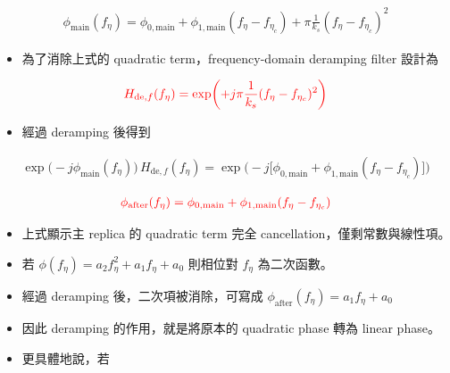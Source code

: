 \documentclass[11pt]{article}
\providecommand{\tightlist}{%
  \setlength{\itemsep}{0pt}\setlength{\parskip}{0pt}}
\begin{document}
\begin{equation}
\begin{aligned}
\phi_{\mathrm{main}}(f_\eta)=\phi_{0,\mathrm{main}}+\phi_{1,\mathrm{main}}(f_\eta-f_{\eta_c})+\pi\frac{1}{k_s}(f_\eta-f_{\eta_c})^2
\end{aligned}
\end{equation}

\begin{itemize}
\tightlist
\item
  為了消除上式的 quadratic term，frequency-domain deramping filter
  設計為
\end{itemize}

\begin{equation}
\begin{aligned}
{\color{red}{H_{\mathrm{de},f}(f_\eta)=\exp\biggl(+j\pi\frac{1}{k_s}(f_\eta-f_{\eta_c})^2\biggr)}}
\end{aligned}
\end{equation}

\begin{itemize}
\tightlist
\item
  經過 deramping 後得到
\end{itemize}

\begin{equation}
\begin{aligned}
\exp\biggl(-j\phi_{\mathrm{main}}(f_\eta)\biggr)\,H_{\mathrm{de},f}(f_\eta) =
\exp\biggl(-j\biggl[\phi_{0,\mathrm{main}}+\phi_{1,\mathrm{main}}(f_\eta-f_{\eta_c})\biggr]\biggr)
\end{aligned}
\end{equation}

\begin{equation}
\begin{aligned}
{\color{red}{\phi_{\mathrm{after}}(f_\eta)=\phi_{0,\mathrm{main}}+\phi_{1,\mathrm{main}}(f_\eta-f_{\eta_c})}}
\end{aligned}
\end{equation}

\begin{itemize}
\item
  上式顯示主 replica 的 quadratic term 完全
  cancellation，僅剩常數與線性項。
\item
  若 \(\phi(f_\eta)=a_2 f_\eta^2+a_1 f_\eta+a_0\) 則相位對 \(f_\eta\)
  為二次函數。
\item
  經過 deramping 後，二次項被消除，可寫成
  \(\phi_{\mathrm{after}}(f_\eta)=a_1 f_\eta+a_0\)
\item
  因此 deramping 的作用，就是將原本的 quadratic phase 轉為 linear
  phase。
\item
  更具體地說，若
\end{itemize}
\end{document}
